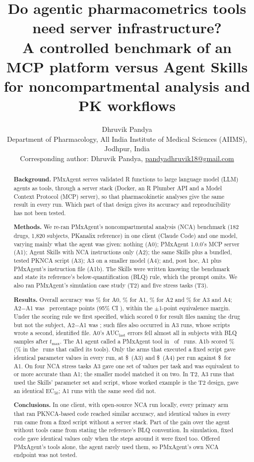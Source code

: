 \documentclass[11pt]{article}
\title{Do agentic pharmacometrics tools need server infrastructure?\\
\large A controlled benchmark of an MCP platform versus Agent Skills for noncompartmental analysis and PK workflows}
\author{Dhruvik Pandya\\[4pt]
\small Department of Pharmacology, All India Institute of Medical Sciences (AIIMS), Jodhpur, India\\
\small Corresponding author: Dhruvik Pandya, \href{mailto:pandyadhruvik18@gmail.com}{pandyadhruvik18@gmail.com}}
\date{}
\begin{document}
\maketitle

\begin{abstract}
\noindent\textbf{Background.} PMxAgent serves validated R functions to large language model (LLM) agents as tools,
through a server stack (Docker, an R Plumber API and a Model Context Protocol (MCP) server), so that pharmacokinetic
analyses give the same result in every run. Which part of that design gives its accuracy and reproducibility has not
been tested.

\noindent\textbf{Methods.} We re-ran PMxAgent's noncompartmental analysis (NCA) benchmark (182 drugs, 1,820 subjects,
PKanalix reference) in one client (Claude Code) and one model, varying mainly what the agent was given: nothing (A0);
PMxAgent 1.0.0's MCP server (A1); Agent Skills with NCA instructions only (A2); the same Skills plus a bundled, tested
PKNCA script (A3); A3 on a smaller model (A4); and, post hoc, A1 plus PMxAgent's instruction file (A1b). The Skills
were written knowing the benchmark and state its reference's below-quantification (BLQ) rule, which the prompt omits.
We also ran PMxAgent's simulation case study (T2) and five stress tasks (T3).

\noindent\textbf{Results.} Overall accuracy was \numToneAzeroAcc\% for A0, \numToneAoneAcc\% for A1,
\numToneAtwoAcc\% for A2 and \numToneAthreeAcc\% for A3 and A4; A2$-$A1 was \numToneAtwoVsAoneDiff\ percentage points
(95\% CI \numToneAtwoVsAoneCI), within the $\pm$1-point equivalence margin. Under the scoring rule we first specified,
which scored 0 for result files naming the drug but not the subject, A2$-$A1 was \numToneAtwoVsAoneVoneDiff; such files
also occurred in A3 runs, whose scripts wrote a second, identified file. A0's AUC$_\mathrm{last}$ errors fell almost
all in subjects with BLQ samples after $t_\mathrm{max}$. The A1 agent called a PMxAgent tool in \numToneAonePmxRuns\ of \numToneAonePmxKnown\
runs. A1b scored \numToneAonebAcc\% (\numToneAonebAccPmxUsed\% in the \numToneAonebPmxRuns\ runs that called its tools).
Only the arms that executed a fixed script gave identical parameter values in every run, at \$\numToneAthreeCost\ (A3)
and \$\numToneAfourCost\ (A4) per run against \$\numToneAoneCost\ for A1. On four NCA stress tasks A3 gave one set of
values per task and was equivalent to or more accurate than A1; the smaller model matched it on two. In T2, A3 runs that
used the Skills' parameter set and script, whose worked example is the T2 design, gave an identical EC$_{50}$; A1 runs
with the same seed did not.

\noindent\textbf{Conclusions.} In one client, with open-source NCA run locally, every primary arm that ran PKNCA-based
code reached similar accuracy, and identical values in every run came from a fixed script without a server stack. Part
of the gain over the agent without tools came from stating the reference's BLQ convention. In simulation, fixed code gave
identical values only when the steps around it were fixed too. Offered PMxAgent's tools alone, the agent rarely used
them, so PMxAgent's own NCA endpoint was not tested.
\end{abstract}
\end{document}
